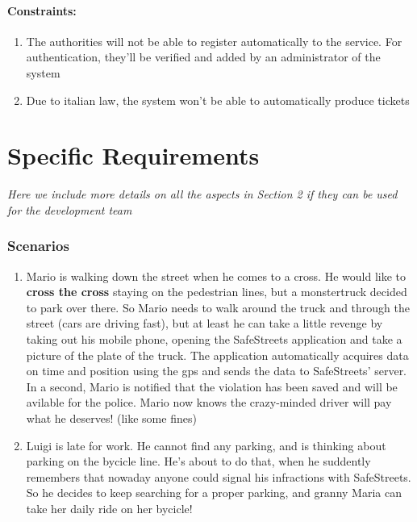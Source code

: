 \documentclass{article}
\newcommand{\enum}[1]{\texttt{#1.\arabic*}}
\begin{document}
	\paragraph{Constraints:}
		\begin{enumerate}[label=\enum{C}]
			\item The authorities will not be able to register automatically to the service. For authentication, they'll be verified and added by an administrator of the system
			\item \label{C_noAutoTickets}Due to italian law, the system won't be able to automatically produce tickets
		\end{enumerate}
	
\section{Specific Requirements} \textit{Here we include more details on all the aspects in Section 2 if they can be used for the development team}

		\subsubsection{Scenarios}
		
			\begin{enumerate}[label=\enum{S}]
				\item \label{S_The man, the street and the monstertruck}
				Mario is walking down the street when he comes to a cross. He would like to \textbf{cross the cross} staying on the pedestrian lines, but a monstertruck decided to park over there. So Mario needs to walk around the truck and through the street (cars are driving fast), but at least he can take a little revenge by taking out his mobile phone, opening the SafeStreets application and take a picture of the plate of the truck. The application automatically acquires data on time and position using the gps and sends the data to SafeStreets' server. In a second, Mario is notified that the violation has been saved and will be avilable for the police.
Mario now knows the crazy-minded driver will pay what he deserves! (like some fines)
				\item \label{S_Prevent is better than healing}Luigi is late for work. He cannot find any parking, and is thinking about parking on the bycicle line. He's about to do that, when he suddently remembers that nowaday anyone could signal his infractions with SafeStreets. So he decides to keep searching for a proper parking, and granny Maria can take her daily ride on her bycicle!
			\end{enumerate}
\end{document}
